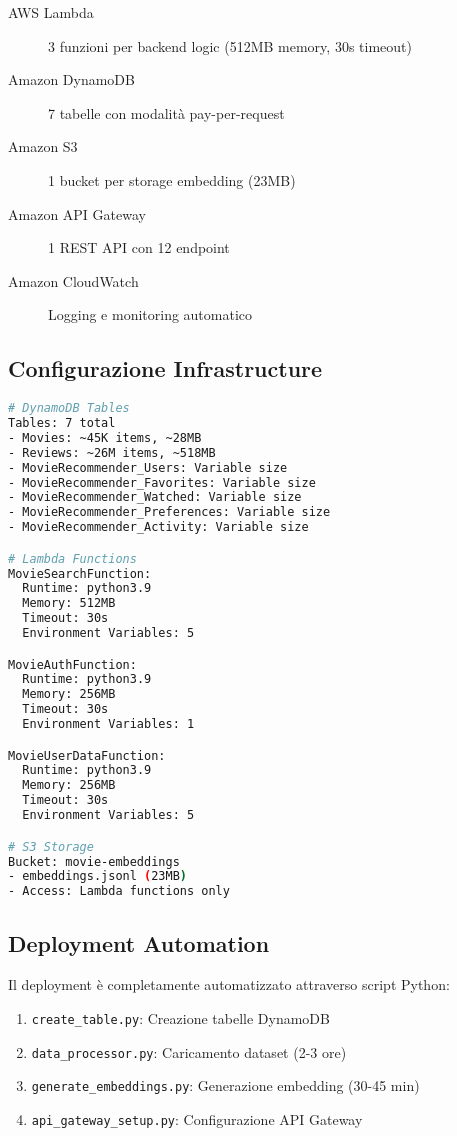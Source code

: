 \documentclass[11pt,a4paper]{article}
\begin{document}
\begin{description}
  \item[AWS Lambda] 3 funzioni per backend logic (512MB memory, 30s timeout)
  \item[Amazon DynamoDB] 7 tabelle con modalità pay-per-request
  \item[Amazon S3] 1 bucket per storage embedding (23MB)
  \item[Amazon API Gateway] 1 REST API con 12 endpoint
  \item[Amazon CloudWatch] Logging e monitoring automatico
\end{description}

\subsection{Configurazione Infrastructure}
\begin{lstlisting}[language=bash, caption=AWS Resources Configuration]
# DynamoDB Tables
Tables: 7 total
- Movies: ~45K items, ~28MB
- Reviews: ~26M items, ~518MB  
- MovieRecommender_Users: Variable size
- MovieRecommender_Favorites: Variable size
- MovieRecommender_Watched: Variable size
- MovieRecommender_Preferences: Variable size
- MovieRecommender_Activity: Variable size

# Lambda Functions
MovieSearchFunction:
  Runtime: python3.9
  Memory: 512MB
  Timeout: 30s
  Environment Variables: 5

MovieAuthFunction:
  Runtime: python3.9
  Memory: 256MB
  Timeout: 30s
  Environment Variables: 1

MovieUserDataFunction:
  Runtime: python3.9
  Memory: 256MB
  Timeout: 30s
  Environment Variables: 5

# S3 Storage
Bucket: movie-embeddings
- embeddings.jsonl (23MB)
- Access: Lambda functions only
\end{lstlisting}

\subsection{Deployment Automation}
Il deployment è completamente automatizzato attraverso script Python:

\begin{enumerate}
  \item \texttt{create\_table.py}: Creazione tabelle DynamoDB
  \item \texttt{data\_processor.py}: Caricamento dataset (2-3 ore)
  \item \texttt{generate\_embeddings.py}: Generazione embedding (30-45 min)
  \item \texttt{api\_gateway\_setup.py}: Configurazione API Gateway
\end{enumerate}
\end{document}
